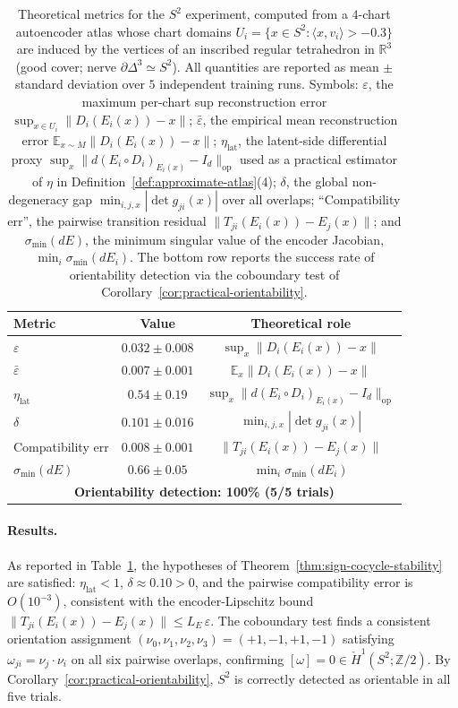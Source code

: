 \documentclass[11pt]{article}
\newcommand{\R}{\mathbb{R}}
\newcommand{\Z}{\mathbb{Z}}
\theoremstyle{plain}
\theoremstyle{definition}
\theoremstyle{remark}
\begin{document}
\begin{table}[ht]
\centering
\caption{Theoretical metrics for the $S^2$ experiment, computed from
a $4$-chart autoencoder atlas whose chart domains
$U_i=\{x\in S^2:\langle x,v_i\rangle>-0.3\}$ are induced by the vertices
of an inscribed regular tetrahedron in $\R^3$ (good cover; nerve
$\partial\Delta^3\simeq S^2$). All quantities are reported as
mean $\pm$ standard deviation over $5$ independent training runs.
Symbols: $\varepsilon$, the maximum per-chart sup reconstruction error
$\sup_{x\in U_i}\|D_i(E_i(x))-x\|$; $\bar\varepsilon$, the empirical mean
reconstruction error $\mathbb{E}_{x\sim M}\|D_i(E_i(x))-x\|$;
$\eta_{\mathrm{lat}}$, the latent-side differential proxy
$\sup_x\|d(E_i\circ D_i)_{E_i(x)}-I_d\|_{\mathrm{op}}$ used as a
practical estimator of $\eta$ in
Definition~\ref{def:approximate-atlas}(4); $\delta$, the global
non-degeneracy gap $\min_{i,j,x}|\det g_{ji}(x)|$ over all overlaps;
``Compatibility err'', the pairwise transition residual
$\|T_{ji}(E_i(x))-E_j(x)\|$; and $\sigma_{\min}(dE)$, the minimum
singular value of the encoder Jacobian, $\min_i\sigma_{\min}(dE_i)$.
The bottom row reports the success rate of orientability detection
via the coboundary test of Corollary~\ref{cor:practical-orientability}.}
\label{tab:s2_metrics}
\begin{tabular}{lcc}
\toprule
Metric & Value & Theoretical role \\
\midrule
$\varepsilon$            & $0.032 \pm 0.008$ & $\sup_x \|D_i(E_i(x)) - x\|$ \\
$\bar\varepsilon$        & $0.007 \pm 0.001$ & $\mathbb{E}_x \|D_i(E_i(x)) - x\|$ \\
$\eta_{\mathrm{lat}}$    & $0.54  \pm 0.19$  & $\sup_x \|d(E_i \circ D_i)_{E_i(x)} - I_d\|_{\mathrm{op}}$ \\
$\delta$                 & $0.101 \pm 0.016$ & $\min_{i,j,x} |\det g_{ji}(x)|$ \\
Compatibility err        & $0.008 \pm 0.001$ & $\|T_{ji}(E_i(x)) - E_j(x)\|$ \\
$\sigma_{\min}(dE)$      & $0.66  \pm 0.05$  & $\min_i \sigma_{\min}(dE_i)$ \\
\midrule
\multicolumn{3}{c}{\textbf{Orientability detection: 100\% (5/5 trials)}} \\
\bottomrule
\end{tabular}
\end{table}


\paragraph{Results.}
As reported in Table~\ref{tab:s2_metrics}, the hypotheses of Theorem~\ref{thm:sign-cocycle-stability} are satisfied: $\eta_{\mathrm{lat}} < 1$, $\delta \approx 0.10 > 0$, and the pairwise compatibility error is $O(10^{-3})$, consistent with the encoder-Lipschitz bound $\|T_{ji}(E_i(x)) - E_j(x)\| \leq L_E\,\varepsilon$. The coboundary test finds a consistent orientation assignment $(\nu_0, \nu_1, \nu_2, \nu_3) = (+1, -1, +1, -1)$ satisfying $\omega_{ji} = \nu_j \cdot \nu_i$ on all six pairwise overlaps, confirming $[\omega] = 0 \in \check{H}^1(S^2; \Z/2)$. By Corollary~\ref{cor:practical-orientability}, $S^2$ is correctly detected as orientable in all five trials.
\end{document}

